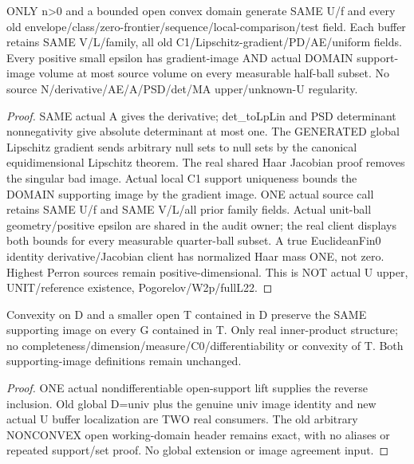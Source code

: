 \begin{lemma}
  \label{lem:regularized-image-upper}
  \leanok
  ONLY n>0 and a bounded open convex domain generate SAME U/f and every old
  envelope/class/zero-frontier/sequence/local-comparison/test field. Each
  buffer retains SAME V/L/family, all old C1/Lipschitz-gradient/PD/AE/uniform
  fields. Every positive small epsilon has gradient-image AND actual DOMAIN
  support-image volume at most source volume on every measurable half-ball
  subset. No source N/derivative/AE/A/PSD/det/MA upper/unknown-U regularity.
\end{lemma}
\begin{proof}
  \leanok
  SAME actual A gives the derivative; det\_toLpLin and PSD determinant
  nonnegativity give absolute determinant at most one. The GENERATED global
  Lipschitz gradient sends arbitrary null sets to null sets by the canonical
  equidimensional Lipschitz theorem. The real shared Haar Jacobian proof
  removes the singular bad image. Actual local C1 support uniqueness bounds
  the DOMAIN supporting image by the gradient image. ONE actual source call
  retains SAME U/f and SAME V/L/all prior family fields. Actual unit-ball
  geometry/positive epsilon are shared in the audit owner; the real client
  displays both bounds for every measurable quarter-ball subset. A true
  EuclideanFin0 identity derivative/Jacobian client has normalized Haar mass
  ONE, not zero. Highest Perron sources remain positive-dimensional. This is
  NOT actual U upper, UNIT/reference existence, Pogorelov/W2p/fullL22.
\end{proof}

\begin{lemma}
  \label{lem:domain-support-localization}
  \leanok
  Convexity on D and a smaller open T contained in D preserve the SAME
  supporting image on every G contained in T. Only real inner-product
  structure; no completeness/dimension/measure/C0/differentiability or
  convexity of T. Both supporting-image definitions remain unchanged.
\end{lemma}
\begin{proof}
  \leanok
  ONE actual nondifferentiable open-support lift supplies the reverse
  inclusion. Old global D=univ plus the genuine univ image identity and new
  actual U buffer localization are TWO real consumers. The old arbitrary
  NONCONVEX open working-domain header remains exact, with no aliases or
  repeated support/set proof. No global extension or image agreement input.
\end{proof}

